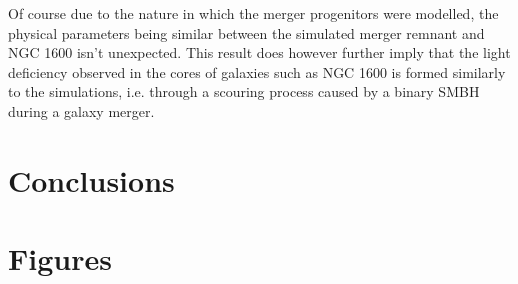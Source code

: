 \documentclass[english, oneside]{HYgradu}
\begin{document}
Of course due to the nature in which the merger progenitors were modelled, the physical parameters being similar between the simulated merger remnant and NGC 1600 isn't unexpected. This result does however further imply that the light deficiency observed in the cores of galaxies such as NGC 1600 is formed similarly to the simulations, i.e. through a scouring process caused by a binary SMBH during a galaxy merger.


\chapter{Conclusions}

\appendix

\chapter{Figures}
\end{document}
